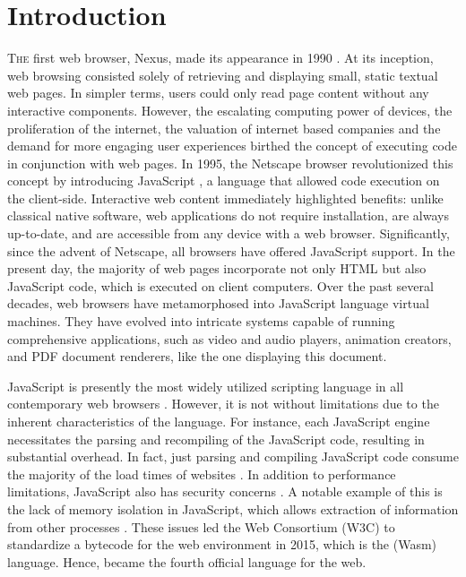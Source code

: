 
\chapter{Introduction}
\label{Intro}


\lettrine[lines=3]{T}{he} first web browser, Nexus, made its appearance in 1990 \cite{nexus}. 
At its inception, web browsing consisted solely of retrieving and displaying small, static textual web pages. 
In simpler terms, users could only read page content without any interactive components. 
However, the escalating computing power of devices, the proliferation of the internet, the valuation of internet based companies and the demand for more engaging user experiences birthed the concept of executing code in conjunction with web pages. 
In 1995, the Netscape browser revolutionized this concept by introducing JavaScript \cite{10.1007/978-3-642-14107-2_7}, a language that allowed code execution on the client-side.
Interactive web content immediately highlighted benefits: unlike classical native software, web applications do not require installation, are always up-to-date, and are accessible from any device with a web browser. 
Significantly, since the advent of Netscape, all browsers have offered JavaScript support. 
In the present day, the majority of web pages incorporate not only HTML but also JavaScript code, which is executed on client computers. 
Over the past several decades, web browsers have metamorphosed into JavaScript language virtual machines. 
They have evolved into intricate systems capable of running comprehensive applications, such as video and audio players, animation creators, and PDF document renderers, like the one displaying this document.

JavaScript is presently the most widely utilized scripting language in all contemporary web browsers \cite{mulazzani2013fast}.
However, it is not without limitations due to the inherent characteristics of the language.
For instance, each JavaScript engine necessitates the parsing and recompiling of the JavaScript code, resulting in substantial overhead.
In fact, just parsing and compiling JavaScript code consume the majority of the load times of websites \cite{clark}.
In addition to performance limitations, JavaScript also has security concerns \cite{10.1145/1190216.1190252}.
A notable example of this is the lack of memory isolation in JavaScript, which allows extraction of information from other processes \cite{10.1145/3412841.3442001}.
These issues led the Web Consortium (W3C) to standardize a bytecode for the web environment in 2015, which is the \Wasm(Wasm) language.
Hence, \Wasm became the fourth official language for the web.


